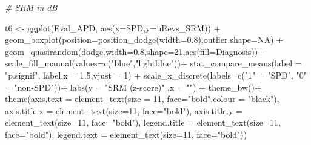 \documentclass[a4paper, twoside]{templates/ociamthesis}
\newenvironment{Shaded}{\begin{snugshade}}{\end{snugshade}}
\newcommand{\AttributeTok}[1]{\textcolor[rgb]{0.77,0.63,0.00}{#1}}
\newcommand{\CommentTok}[1]{\textcolor[rgb]{0.56,0.35,0.01}{\textit{#1}}}
\newcommand{\ConstantTok}[1]{\textcolor[rgb]{0.00,0.00,0.00}{#1}}
\newcommand{\DecValTok}[1]{\textcolor[rgb]{0.00,0.00,0.81}{#1}}
\newcommand{\FloatTok}[1]{\textcolor[rgb]{0.00,0.00,0.81}{#1}}
\newcommand{\FunctionTok}[1]{\textcolor[rgb]{0.00,0.00,0.00}{#1}}
\newcommand{\NormalTok}[1]{#1}
\newcommand{\OtherTok}[1]{\textcolor[rgb]{0.56,0.35,0.01}{#1}}
\newcommand{\SpecialCharTok}[1]{\textcolor[rgb]{0.00,0.00,0.00}{#1}}
\newcommand{\StringTok}[1]{\textcolor[rgb]{0.31,0.60,0.02}{#1}}
\renewenvironment{Shaded}
{
  \vspace{4pt}%
  \begin{snugshade}%
}{%
  \end{snugshade}%
  \vspace{4pt}%
}
\begin{document}
\begin{Shaded}
\begin{Highlighting}[]
\CommentTok{\# SRM in dB}

\NormalTok{t6 }\OtherTok{\textless{}{-}} \FunctionTok{ggplot}\NormalTok{(Eval\_APD, }\FunctionTok{aes}\NormalTok{(}\AttributeTok{x=}\NormalTok{SPD,}\AttributeTok{y=}\NormalTok{uRevs\_SRM)) }\SpecialCharTok{+}
    \FunctionTok{geom\_boxplot}\NormalTok{(}\AttributeTok{position=}\FunctionTok{position\_dodge}\NormalTok{(}\AttributeTok{width=}\FloatTok{0.8}\NormalTok{),}\AttributeTok{outlier.shape=}\ConstantTok{NA}\NormalTok{) }\SpecialCharTok{+} 
  \FunctionTok{geom\_quasirandom}\NormalTok{(}\AttributeTok{dodge.width=}\FloatTok{0.8}\NormalTok{,}\AttributeTok{shape=}\DecValTok{21}\NormalTok{,}\FunctionTok{aes}\NormalTok{(}\AttributeTok{fill=}\NormalTok{Diagnosis))}\SpecialCharTok{+}
  \FunctionTok{scale\_fill\_manual}\NormalTok{(}\AttributeTok{values=}\FunctionTok{c}\NormalTok{(}\StringTok{"blue"}\NormalTok{,}\StringTok{"lightblue"}\NormalTok{))}\SpecialCharTok{+}
  \FunctionTok{stat\_compare\_means}\NormalTok{(}\AttributeTok{label =}  \StringTok{"p.signif"}\NormalTok{, }\AttributeTok{label.x =} \FloatTok{1.5}\NormalTok{,}\AttributeTok{vjust =} \DecValTok{1}\NormalTok{) }\SpecialCharTok{+}  
  \FunctionTok{scale\_x\_discrete}\NormalTok{(}\AttributeTok{labels=}\FunctionTok{c}\NormalTok{(}\StringTok{"1"} \OtherTok{=} \StringTok{"SPD"}\NormalTok{, }\StringTok{"0"} \OtherTok{=} \StringTok{"non{-}SPD"}\NormalTok{))}\SpecialCharTok{+}
  \FunctionTok{labs}\NormalTok{(}\AttributeTok{y =} \StringTok{"SRM (z{-}score)"}\NormalTok{ ,}\AttributeTok{x =} \StringTok{""}\NormalTok{) }\SpecialCharTok{+}
  \FunctionTok{theme\_bw}\NormalTok{()}\SpecialCharTok{+}
  \FunctionTok{theme}\NormalTok{(}\AttributeTok{axis.text =} \FunctionTok{element\_text}\NormalTok{(}\AttributeTok{size =} \DecValTok{11}\NormalTok{, }\AttributeTok{face=}\StringTok{"bold"}\NormalTok{,}\AttributeTok{colour =} \StringTok{"black"}\NormalTok{),}
        \AttributeTok{axis.title.x =} \FunctionTok{element\_text}\NormalTok{(}\AttributeTok{size=}\DecValTok{11}\NormalTok{, }\AttributeTok{face=}\StringTok{"bold"}\NormalTok{),}
        \AttributeTok{axis.title.y =} \FunctionTok{element\_text}\NormalTok{(}\AttributeTok{size=}\DecValTok{11}\NormalTok{, }\AttributeTok{face=}\StringTok{"bold"}\NormalTok{),}
        \AttributeTok{legend.title =} \FunctionTok{element\_text}\NormalTok{(}\AttributeTok{size=}\DecValTok{11}\NormalTok{, }\AttributeTok{face=}\StringTok{"bold"}\NormalTok{),}
        \AttributeTok{legend.text  =} \FunctionTok{element\_text}\NormalTok{(}\AttributeTok{size=}\DecValTok{11}\NormalTok{, }\AttributeTok{face=}\StringTok{"bold"}\NormalTok{))}


\end{Highlighting}
\end{Shaded}
\end{document}
